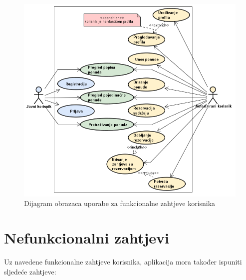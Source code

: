 \documentclass[times, utf8, zavrsni, numeric]{fer}
\newcommand{\razmakp}{\vspace{18pt}}
\begin{document}
\razmakp
\razmakp

\begin{figure}[htb]
\centering
\includegraphics[width=14.7cm]{img/use-case.png}
\caption{Dijagram obrazaca uporabe za funkcionalne zahtjeve korisnika}
\label{fig:use-case}
\end{figure}

\newpage


\section{Nefunkcionalni zahtjevi}

Uz navedene funkcionalne zahtjeve korisnika, aplikacija mora također ispuniti sljedeće zahtjeve:
\end{document}

